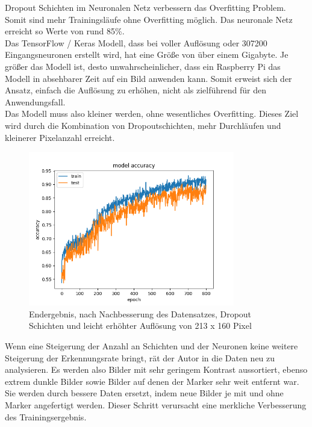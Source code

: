 \documentclass[conference]{IEEEtran}
\begin{document}
	Dropout Schichten im Neuronalen Netz verbessern das Overfitting 
	Problem. Somit sind mehr Trainingsläufe ohne Overfitting möglich. Das 
	neuronale Netz erreicht so Werte von rund 85\%. \\
	
	Das TensorFlow / Keras Modell, dass bei voller Auflösung oder 307200 
	Eingangsneuronen erstellt wird, hat eine Größe von über einem 
	Gigabyte. Je größer das Modell ist, desto unwahrscheinlicher, dass ein 
	Raspberry Pi das Modell in absehbarer Zeit auf ein Bild anwenden kann. 
	Somit erweist sich der Ansatz, einfach die Auflösung zu erhöhen, nicht als 
	zielführend für den Anwendungsfall. \\
	
	Das Modell muss also kleiner werden, ohne wesentliches Overfitting. 
	Dieses Ziel wird durch die Kombination von Dropoutschichten, mehr 
	Durchläufen und kleinerer Pixelanzahl erreicht. \\
		\begin{figure}[!t]
		\centering
		\includegraphics[width=9cm]{img/213x160:800@32:0_accuracy.png}
		\caption{Endergebnis, nach Nachbesserung des Datensatzes, Dropout 
		Schichten und leicht erhöhter Auflösung von 213 x 160 Pixel}
		\label{end Ergenisse }
	\end{figure}
	 Wenn eine Steigerung der Anzahl an Schichten und der Neuronen keine 
	 weitere Steigerung der Erkennungsrate bringt, rät der Autor in 
	 \cite{moolayil2019learn} die Daten neu zu analysieren. Es werden also 
	 Bilder mit sehr geringem Kontrast aussortiert, ebenso extrem dunkle Bilder 
	 sowie Bilder auf denen der Marker sehr weit entfernt war. Sie werden 
	 durch bessere Daten ersetzt, indem neue Bilder je mit und ohne Marker angefertigt werden.
	 Dieser Schritt verursacht eine merkliche Verbesserung des Trainingsergebnis.
	\\
		
\end{document}
